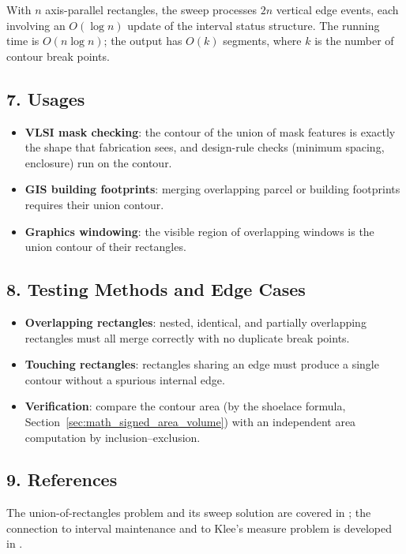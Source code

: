 With $n$ axis-parallel rectangles, the sweep processes $2n$ vertical edge
events, each involving an $O(\log n)$ update of the interval status
structure. The running time is $O(n\log n)$; the output has $O(k)$ segments,
where $k$ is the number of contour break points.

\subsection{7. Usages}

\begin{itemize}
\item \textbf{VLSI mask checking}: the contour of the union of mask
  features is exactly the shape that fabrication sees, and design-rule
  checks (minimum spacing, enclosure) run on the contour.
\item \textbf{GIS building footprints}: merging overlapping parcel or
  building footprints requires their union contour.
\item \textbf{Graphics windowing}: the visible region of overlapping
  windows is the union contour of their rectangles.
\end{itemize}

\subsection{8. Testing Methods and Edge Cases}

\begin{itemize}
\item \textbf{Overlapping rectangles}: nested, identical, and partially
  overlapping rectangles must all merge correctly with no duplicate break
  points.
\item \textbf{Touching rectangles}: rectangles sharing an edge must produce
  a single contour without a spurious internal edge.
\item \textbf{Verification}: compare the contour area (by the shoelace
  formula, Section~\ref{sec:math_signed_area_volume}) with an independent
  area computation by inclusion--exclusion.
\end{itemize}

\subsection{9. References}

The union-of-rectangles problem and its sweep solution are covered in
\cite{berg2008,bentley1977}; the connection to interval maintenance and to
Klee's measure problem is developed in \cite{bentley1977,bentley1979}.

